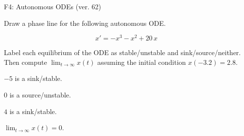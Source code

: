 \begin{exercise}
  \begin{exerciseTitle}F4: Autonomous ODEs (ver. 62)\end{exerciseTitle}
  \begin{exerciseStatement}
    

      Draw a phase line for the following 
      autonomous ODE.
    

    
\[x'= -x^{3} - x^{2} + 20 \, x\]

    

      Label each equilibrium of the ODE
      as stable/unstable and sink/source/neither.
      Then compute \(\lim_{t\to\infty}x(t)\)
      assuming the initial condition
      \(x( -3.2 )= 2.8\).
    

  \end{exerciseStatement}
  \begin{exerciseAnswer}
    

      \(-5\) is a sink/stable.
      
        \(0\) is a source/unstable.
      
      \(4\) is a sink/stable.
    

    

      \(\lim_{t\to\infty}x(t)=0\).
    

  \end{exerciseAnswer}
\end{exercise}